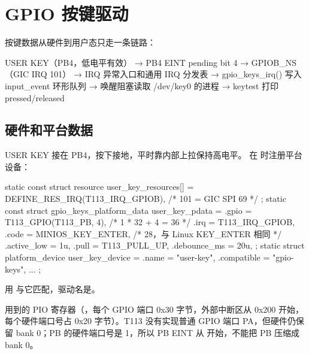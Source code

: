 \section{GPIO 按键驱动}

按键数据从硬件到用户态只走一条链路：

\begin{txtcode}
USER KEY（PB4，低电平有效）
  → PB4 EINT pending bit 4
  → GPIOB_NS（GIC IRQ 101）
  → IRQ 异常入口和通用 IRQ 分发表
  → gpio_keys_irq() 写入 input_event 环形队列
  → 唤醒阻塞读取 /dev/key0 的进程
  → keytest 打印 pressed/released
\end{txtcode}

\subsection{硬件和平台数据}

USER KEY 接在 PB4，按下接地，平时靠内部上拉保持高电平。 在 时注册平台设备：

\begin{ccode}
static const struct resource user_key_resources[] = {
    DEFINE_RES_IRQ(T113_IRQ_GPIOB),             /* 101 = GIC SPI 69 */
};
static const struct gpio_keys_platform_data user_key_pdata = {
    .gpio = T113_GPIO(T113_PB, 4),              /* 1 * 32 + 4 = 36 */
    .irq = T113_IRQ_GPIOB,
    .code = MINIOS_KEY_ENTER,                   /* 28，与 Linux KEY_ENTER 相同 */
    .active_low = 1u,
    .pull = T113_PULL_UP,
    .debounce_ms = 20u,
};
static struct platform_device user_key_device = {
    .name = "user-key",
    .compatible = "gpio-keys",
    ...
};
\end{ccode}

 用  与它匹配，驱动名是。

用到的 PIO 寄存器（，每个 GPIO 端口 0x30 字节，外部中断区从 0x200 开始，每个硬件端口号占 0x20 字节）。T113 没有实现普通 GPIO 端口 PA，但硬件仍保留 bank 0；PB 的硬件端口号是 1，所以 PB EINT 从  开始，不能把 PB 压缩成 bank 0。

